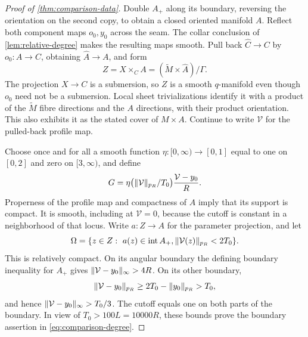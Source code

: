 \begin{proof}[Proof of \cref{thm:comparison-data}]
Double $A_+$ along its boundary, reversing the orientation on the
second copy, to obtain a closed oriented manifold $A$.  Reflect both
component maps $o_0,y_0$ across the seam.  The collar conclusion of
\cref{lem:relative-degree} makes the resulting maps smooth.  Pull back
$\widehat C\to C$ by $o_0:A\to C$, obtaining $\widehat A\to A$, and
form
\[
 Z=X\times_C A=(\widetilde M\times\widehat A)/\Gamma.
\]
The projection $X\to C$ is a submersion, so $Z$ is a smooth
$q$-manifold even though $o_0$ need not be a submersion.  Local sheet
trivializations identify it with a product of the
$\widetilde M$ fibre directions and the $A$ directions, with their product
orientation.  This also exhibits it as the stated cover of $M\times A$.
Continue to write $\mathcal V$ for the pulled-back profile map.

Choose once and for all a smooth function $\eta:[0,\infty)\to[0,1]$
equal to one on $[0,2]$ and zero on $[3,\infty)$, and define
\begin{equation}
\label{eq:comparison-map}
 G=\eta\bigl(\lVert\mathcal V\rVert_{p_R}/T_0\bigr)
       \frac{\mathcal V-y_0}{R}.
\end{equation}
Properness of the profile map and compactness of $A$ imply that its
support is compact.  It is smooth, including at $\mathcal V=0$,
because the cutoff is constant in a neighborhood of that locus.
Write $a:Z\to A$ for the parameter projection, and let
\[
 \Omega=\{z\in Z:\ a(z)\in\operatorname{int}A_+,
                       \lVert\mathcal V(z)\rVert_{p_R}<2T_0\}.
\]
This is relatively compact.  On its angular boundary the defining
boundary inequality for $A_+$ gives
$\lVert\mathcal V-y_0\rVert_\infty>4R$.  On its other boundary,
\[
 \lVert\mathcal V-y_0\rVert_{p_R}
 \ge2T_0-\lVert y_0\rVert_{p_R}>T_0,
\]
and hence $\lVert\mathcal V-y_0\rVert_\infty>T_0/3$.
The cutoff equals one on both parts of the boundary.  In view of
$T_0>100L=10000R$, these bounds prove the boundary assertion in
\cref{eq:comparison-degree}.


\end{proof}
